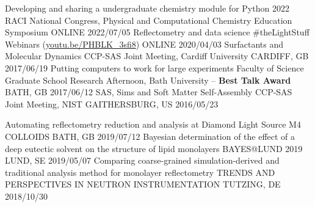 \vspace{-0.4cm}
\begin{cvhonors}
  \cvhonor
    {Developing and sharing a undergraduate chemistry module for Python}
    {2022 RACI National Congress, Physical and Computational Chemistry Education Symposium}
    {ONLINE}
    {2022/07/05}
  \cvhonor
    {Reflectometry and data science}
    {\#theLightStuff Webinars (\href{https://youtu.be/PHBLK_3sfi8}{youtu.be/PHBLK\_3sfi8})}
    {ONLINE}
    {2020/04/03}
  \cvhonor
    {Surfactants and Molecular Dynamics}
    {CCP-SAS Joint Meeting, Cardiff University}
    {CARDIFF, GB}
    {2017/06/19}
  \cvhonor
    {Putting computers to work for large experiments}
    {Faculty of Science Graduate School Research Afternoon, Bath University -- \textbf{Best Talk Award}}
    {BATH, GB}
    {2017/06/12}
  \cvhonor
    {SAS, Sims and Soft Matter Self-Assembly}
    {CCP-SAS Joint Meeting, NIST}
    {GAITHERSBURG, US}
    {2016/05/23}
\end{cvhonors}
\begin{cvhonors}
  \cvhonor
    {Automating reflectometry reduction and analysis at Diamond Light Source}
    {M4 COLLOIDS}
    {BATH, GB}
    {2019/07/12}
  \cvhonor
    {Bayesian determination of the effect of a deep eutectic solvent on the structure of lipid monolayers}
    {BAYES@LUND 2019}
    {LUND, SE}
    {2019/05/07}
  \cvhonor
    {Comparing coarse-grained simulation-derived and traditional analysis method for monolayer reflectometry}
    {TRENDS AND PERSPECTIVES IN NEUTRON INSTRUMENTATION}
    {TUTZING, DE}
    {2018/10/30}
\end{cvhonors}
